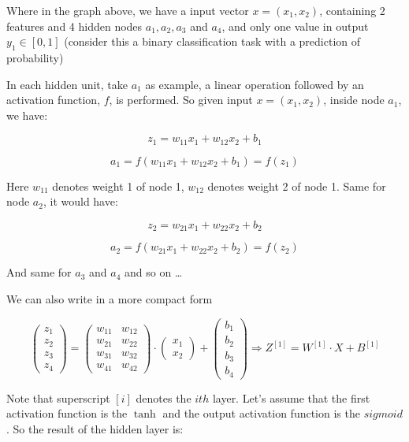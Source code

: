 \documentclass[11pt]{article}
\begin{document}
    Where in the graph above, we have a input vector \(x = (x_1, x_2)\),
containing 2 features and 4 hidden nodes \(a_1, a_2, a_3\) and \(a_4\),
and only one value in output \(y_1 \in [0, 1]\) (consider this a binary
classification task with a prediction of probability)

    In each hidden unit, take \(a_1\) as example, a linear operation
followed by an activation function, \(f\), is performed. So given input
\(x = (x_1, x_2)\), inside node \(a_1\), we have:

\[z_1 = w_{11}x_1 + w_{12}x_2 + b_1\]

\[a_1 = f(w_{11}x_1 + w_{12}x_2 + b_1) = f(z_1) \]

Here \(w_{11}\) denotes weight 1 of node 1, \(w_{12}\) denotes weight 2
of node 1. Same for node \(a_2\), it would have:

\[z_2 = w_{21}x_1 + w_{22}x_2 + b_2\]

\[a_2  = f(w_{21}x_1 + w_{22}x_2 + b_2) = f(z_2)\]

And same for \(a_3\) and \(a_4\) and so on \ldots{}

We can also write in a more compact form

\begin{equation}
\begin{pmatrix}
z_1 \\ z_2 \\ z_3 \\ z_4
\end{pmatrix} =
\begin{pmatrix}
w_{11} & w_{12} \\ w_{21} & w_{22} \\ w_{31} & w_{32} \\ w_{41} & w_{42}
\end{pmatrix} 
\cdot 
\begin{pmatrix}
x_1 \\ x_2 
\end{pmatrix}
+
\begin{pmatrix}
b_1 \\ b_2 \\ b_3 \\ b_4
\end{pmatrix} 
\Rightarrow Z^{[1]} = W^{[1]} \cdot X + B^{[1]} 
\end{equation}

Note that superscript \([i]\) denotes the \(ith\) layer. Let's assume
that the first activation function is the \(\tanh\) and the output
activation function is the \(sigmoid\). So the result of the hidden
layer is:
\end{document}
